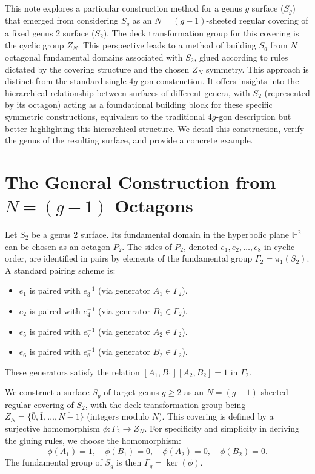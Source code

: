 \documentclass{article}
\theoremstyle{definition}
\theoremstyle{remark}
\begin{document}
This note explores a particular construction method for a genus $g$ surface ($S_g$) that emerged from considering $S_g$ as an $N=(g-1)$-sheeted regular covering of a fixed genus 2 surface ($S_2$). The deck transformation group for this covering is the cyclic group $Z_N$. This perspective leads to a method of building $S_g$ from $N$ octagonal fundamental domains associated with $S_2$, glued according to rules dictated by the covering structure and the chosen $Z_N$ symmetry. This approach is distinct from the standard single $4g$-gon construction. It offers insights into the hierarchical relationship between surfaces of different genera, with $S_2$ (represented by its octagon) acting as a foundational building block for these specific symmetric constructions, equivalent to the traditional $4g$-gon description but better highlighting this hierarchical structure. We detail this construction, verify the genus of the resulting surface, and provide a concrete example.

\section{The General Construction from $N=(g-1)$ Octagons}

Let $S_2$ be a genus 2 surface. Its fundamental domain in the hyperbolic plane $\mathbb{H}^2$ can be chosen as an octagon $P_2$. The sides of $P_2$, denoted $e_1, e_2, \ldots, e_8$ in cyclic order, are identified in pairs by elements of the fundamental group $\Gamma_2 = \pi_1(S_2)$. A standard pairing scheme is:
\begin{itemize}
    \item $e_1$ is paired with $e_3^{-1}$ (via generator $A_1 \in \Gamma_2$).
    \item $e_2$ is paired with $e_4^{-1}$ (via generator $B_1 \in \Gamma_2$).
    \item $e_5$ is paired with $e_7^{-1}$ (via generator $A_2 \in \Gamma_2$).
    \item $e_6$ is paired with $e_8^{-1}$ (via generator $B_2 \in \Gamma_2$).
\end{itemize}
These generators satisfy the relation $[A_1, B_1][A_2, B_2] = 1$ in $\Gamma_2$.

We construct a surface $S_g$ of target genus $g \ge 2$ as an $N=(g-1)$-sheeted regular covering of $S_2$, with the deck transformation group being $Z_N = \{\bar{0}, \bar{1}, \ldots, \overline{N-1}\}$ (integers modulo $N$). This covering is defined by a surjective homomorphism $\phi: \Gamma_2 \to Z_N$. For specificity and simplicity in deriving the gluing rules, we choose the homomorphism:
$$ \phi(A_1) = \bar{1}, \quad \phi(B_1) = \bar{0}, \quad \phi(A_2) = \bar{0}, \quad \phi(B_2) = \bar{0}. $$
The fundamental group of $S_g$ is then $\Gamma_g = \ker(\phi)$.
\end{document}
